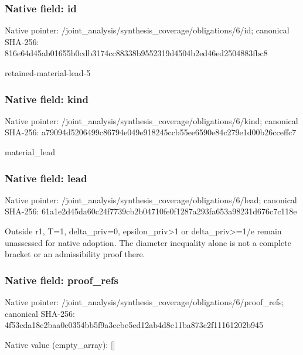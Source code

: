 \documentclass[10pt,a4paper]{article}
\begin{document}
\subsubsection{Native field: id}
Native pointer: /joint\_\allowbreak{}analysis/synthesis\_\allowbreak{}coverage/obligations/6/id; canonical SHA-256: 816e64d45ab01655b0cdb3174cc88338b9552319d4504b2ed46ed2504883fbc8

\begingroup\raggedright\sloppy retained-material-lead-5\par\endgroup

\subsubsection{Native field: kind}
Native pointer: /joint\_\allowbreak{}analysis/synthesis\_\allowbreak{}coverage/obligations/6/kind; canonical SHA-256: a79094d5206499c86794e049e918245ccb55ee6590e84c279e1d00b26cceffc7

\begingroup\raggedright\sloppy material\_\allowbreak{}lead\par\endgroup

\subsubsection{Native field: lead}
Native pointer: /joint\_\allowbreak{}analysis/synthesis\_\allowbreak{}coverage/obligations/6/lead; canonical SHA-256: 61a1e2d45da60c24f7739cb2b04710fe0f1287a293fa653a98231d676c7c118e

\begingroup\raggedright\sloppy Outside r1,\allowbreak{} T=\allowbreak{}1,\allowbreak{} delta\_\allowbreak{}priv=\allowbreak{}0,\allowbreak{} epsilon\_\allowbreak{}priv>1 or delta\_\allowbreak{}priv>=\allowbreak{}1/\allowbreak{}e remain unassessed for native adoption. The diameter inequality alone is not a complete bracket or an admissibility proof there.\par\endgroup

\subsubsection{Native field: proof\_\allowbreak{}refs}
Native pointer: /joint\_\allowbreak{}analysis/synthesis\_\allowbreak{}coverage/obligations/6/proof\_\allowbreak{}refs; canonical SHA-256: 4f53cda18c2baa0c0354bb5f9a3ecbe5ed12ab4d8e11ba873c2f11161202b945

Native value (empty\_\allowbreak{}array): []
\end{document}

